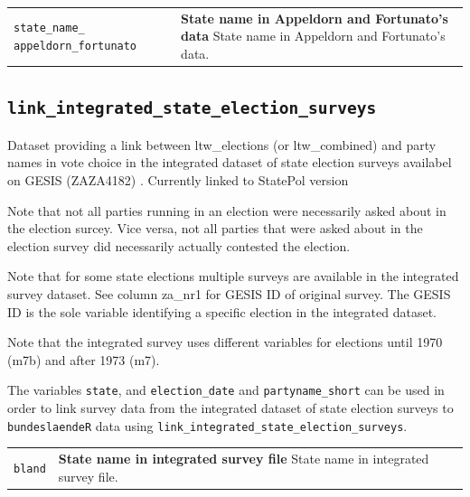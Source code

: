 \documentclass[
]{scrartcl}
\begin{document}
\begin{longtable}{p{3.2cm}| p{11cm}}
\texttt{state\_name\_
appeldorn\_fortunato} &\textbf{State name in Appeldorn and Fortunato's data}\newline 
State name in Appeldorn and Fortunato's data.
\end{longtable}

\newpage

\subsection{\texorpdfstring{\texttt{link\_integrated\_state\_election\_surveys}}{link\_integrated\_state\_election\_surveys}}\label{link_integrated_state_election_surveys}

Dataset providing a link between ltw\_elections (or ltw\_combined) and
party names in vote choice in the integrated dataset of state election
surveys availabel on GESIS (ZAZA4182)
\parencite{scheuchGermanFederalState2015}. Currently linked to StatePol
version

Note that not all parties running in an election were necessarily asked
about in the election surcey. Vice versa, not all parties that were
asked about in the election survey did necessarily actually contested
the election.

Note that for some state elections multiple surveys are available in the
integrated survey dataset. See column za\_nr1 for GESIS ID of original
survey. The GESIS ID is the sole variable identifying a specific
election in the integrated dataset.

Note that the integrated survey uses different variables for elections
until 1970 (m7b) and after 1973 (m7).

The variables \texttt{state}, and \texttt{election\_date} and
\texttt{partyname\_short} can be used in order to link survey data from
the integrated dataset of state election surveys to
\texttt{bundeslaendeR} data using
\texttt{link\_integrated\_state\_election\_surveys}.

\begin{longtable}{p{3.2cm}| p{11cm}}
\texttt{bland} &\textbf{State name in integrated survey file}\newline 
State name in integrated survey file.
\end{longtable}
\end{document}
